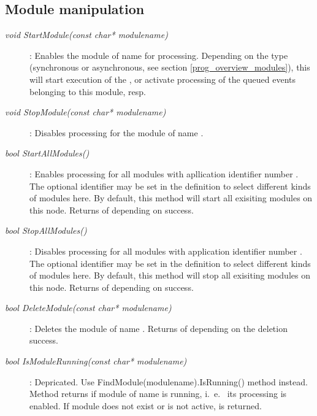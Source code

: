 \subsection{Module manipulation}	

\begin{description}

\item[\em void StartModule\small (const char* modulename)] :
Enables the module of name  for processing.
Depending on the  type (synchronous or asynchronous,
see section \ref{prog_overview_modules}), this will start
execution of the , or activate processing of the
queued events belonging to this module, resp.

\item[\em void StopModule\small (const char* modulename)] :
Disables processing for the module of name .


\item[\em bool StartAllModules\small ()] :
Enables processing for all modules with apllication identifier number .
The optional identifier  may be set in the  definition
to select different kinds of modules here. By default, this method will
start all exisiting modules on this node.
Returns  of  depending on success.

\item[\em bool StopAllModules\small ()] :
Disables processing for all modules with application identifier number .
The optional identifier  may be set in the  definition
to select different kinds of modules here. By default, this method will
stop all exisiting modules on this node.
Returns  of  depending on success.

\item[\em bool DeleteModule\small (const char* modulename)] :
Deletes the module of name . Returns  of  
 depending on the deletion success.

\item[\em bool IsModuleRunning\small (const char* modulename)] :
Depricated. Use FindModule(modulename).IsRunning() method instead.
Method returns  if module of name 
is running, i.~e.~ its processing is enabled. If module does not exist
or is not active,  is returned. 
         

\end{description}
